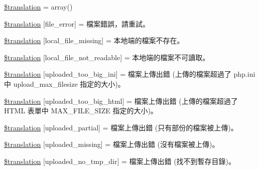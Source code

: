 \begin{DoxyCompactItemize}
\item 
\hyperlink{class_8upload_8zh___t_w_8php_a1f198d410fecc3871ebdd468d343a5e3}{\$translation} = array()
\item 
\hyperlink{class_8upload_8zh___t_w_8php_ac7498e49b9771b04698029aa61c70821}{\$translation} \mbox{[}\textquotesingle{}file\+\_\+error\textquotesingle{}\mbox{]} = \textquotesingle{}檔案錯誤，請重試。\textquotesingle{}
\item 
\hyperlink{class_8upload_8zh___t_w_8php_a6ec3d3a47ab70d77e7aa593e82ead10e}{\$translation} \mbox{[}\textquotesingle{}local\+\_\+file\+\_\+missing\textquotesingle{}\mbox{]} = \textquotesingle{}本地端的檔案不存在。\textquotesingle{}
\item 
\hyperlink{class_8upload_8zh___t_w_8php_a60104befef9b241f3a7a6a755618a4b3}{\$translation} \mbox{[}\textquotesingle{}local\+\_\+file\+\_\+not\+\_\+readable\textquotesingle{}\mbox{]} = \textquotesingle{}本地端的檔案不可讀取。\textquotesingle{}
\item 
\hyperlink{class_8upload_8zh___t_w_8php_a6a08dcd0d3651fdd098568f6b2f0a42c}{\$translation} \mbox{[}\textquotesingle{}uploaded\+\_\+too\+\_\+big\+\_\+ini\textquotesingle{}\mbox{]} = \textquotesingle{}檔案上傳出錯 (上傳的檔案超過了 php.\+ini 中 upload\+\_\+max\+\_\+filesize 指定的大小)。\textquotesingle{}
\item 
\hyperlink{class_8upload_8zh___t_w_8php_a623d5b8b92169f57d7e43458aa911cbb}{\$translation} \mbox{[}\textquotesingle{}uploaded\+\_\+too\+\_\+big\+\_\+html\textquotesingle{}\mbox{]} = \textquotesingle{}檔案上傳出錯 (上傳的檔案超過了 H\+T\+M\+L 表單中 M\+A\+X\+\_\+\+F\+I\+L\+E\+\_\+\+S\+I\+Z\+E 指定的大小)。\textquotesingle{}
\item 
\hyperlink{class_8upload_8zh___t_w_8php_a967c17da21b0a2d3bd65cca3a9ca0ea8}{\$translation} \mbox{[}\textquotesingle{}uploaded\+\_\+partial\textquotesingle{}\mbox{]} = \textquotesingle{}檔案上傳出錯 (只有部份的檔案被上傳)。\textquotesingle{}
\item 
\hyperlink{class_8upload_8zh___t_w_8php_a0cce433260be65f1f35853a6b4b8952b}{\$translation} \mbox{[}\textquotesingle{}uploaded\+\_\+missing\textquotesingle{}\mbox{]} = \textquotesingle{}檔案上傳出錯 (沒有檔案被上傳)。\textquotesingle{}
\item 
\hyperlink{class_8upload_8zh___t_w_8php_ae3cdc68fe248399f77246c91b0555341}{\$translation} \mbox{[}\textquotesingle{}uploaded\+\_\+no\+\_\+tmp\+\_\+dir\textquotesingle{}\mbox{]} = \textquotesingle{}檔案上傳出錯 (找不到暫存目錄)。\textquotesingle{}

\end{DoxyCompactItemize}
